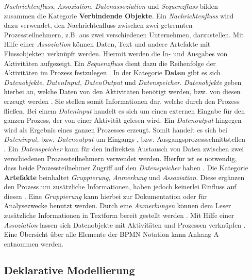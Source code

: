 \textit{Nachrichtenfluss}, \textit{Assoziation}, \textit{Datenassoziation} und \textit{Sequenzfluss} bilden zusammen die Kategorie \textbf{Verbindende Objekte}. Ein \textit{Nachrichtenfluss} wird dazu verwendet, den Nachrichtenfluss zwischen zwei getrennten Prozessteilnehmern, z.B. aus zwei verschiedenen Unternehmen, darzustellen. Mit Hilfe einer \textit{Assoziation} können Daten, Text und andere Artefakte mit Flussobjekten verknüpft werden. Hiermit werden die In- und Ausgabes von Aktivitäten aufgezeigt. Ein \textit{Sequenzfluss} dient dazu die Reihenfolge der Aktivitäten im Prozess festzulegen \cite{white2004}. \newline
In der Kategorie \textbf{Daten} gibt es sich \textit{Datenobjekte}, \textit{DatenInput}, \textit{DatenOutput} und \textit{Datenspeicher}. \textit{Datenobjekte} geben hierbei an, welche Daten von den Aktivitäten benötigt werden, bzw. von diesen erzeugt werden \cite{white2004}. Sie stellen somit Informationen dar, welche durch den Prozess fließen. Bei einem  \textit{Dateninput} handelt es sich um einen externen Eingabe für den ganzen Prozess, der von einer Aktivität gelesen wird. Ein \textit{Datenoutput} hingegen wird als Ergebnis eines ganzen Prozesses erzeugt. Somit handelt es sich bei \textit{Dateninput}, bzw. \textit{Datenoutput} um Eingangs-, bzw. Ausgangsprozessschnittstellen \cite{bpmnposter}. Ein \textit{Datenspeicher} kann für den indirekten Austausch von Daten zwischen zwei verschiedenen Prozessteilnehmern verwendet werden. Hierfür ist es notwendig, dass beide Prozessteilnehmer Zugriff auf den \textit{Datenspeicher} haben \cite{allweyer2013}.\newline
Die Kategorie \textbf{Artefakte} beinhaltet \textit{Gruppierung}, \textit{Anmerkung} und \textit{Assoziation}. Diese ergänzen den Prozess um zusätzliche Informationen, haben jedoch keinerlei Einfluss auf diesen \cite{gpfert2012}. Eine \textit{Gruppierung} kann hierbei zur Dokumentation oder für Analysezwecke benutzt werden. Durch eine \textit{Anmerkungen} können dem Leser zusätzliche Informationen in Textform bereit gestellt werden \cite{white2004}. Mit Hilfe einer \textit{Assoziation} lassen sich Datenobjekte mit Aktivitäten und Prozessen verknüpfen \cite{bpmnposter}. \newline
 Eine Übersicht über alle Elemente der BPMN Notation kann Anhang A entnommen werden.\newline





\subsection{Deklarative Modellierung}

